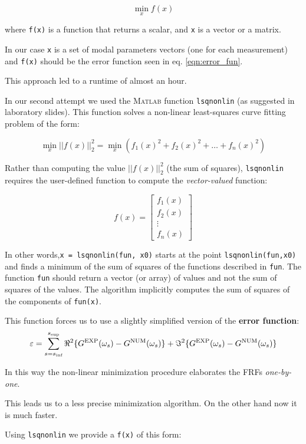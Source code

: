 \documentclass[a4paper,12pt,oneside]{article}
\begin{document}
\[
	\min_x f(x)
\]

where \lstinline!f(x)! is a function that returns a scalar, and \lstinline!x! is a vector or a matrix. 

In our case \lstinline!x! is a set of modal parameters vectors (one for each measurement) and \lstinline!f(x)! should be the error function seen in eq. \ref{eqn:error_fun}.

This approach led to a runtime of almost an hour.

In our second attempt we used the \textsc{Matlab} function \lstinline!lsqnonlin! (as suggested in laboratory slides). This function solves a non-linear least-squares curve fitting problem of the form:

\[
	\min_x ||f(x)||_2^2 =
	\min_x \left(f_1 (x)^2 + f_2(x)^2 + \ldots + f_n (x)^2 \right) 
\]

Rather than computing the value $ ||f(x)||_2^2 $ (the sum of squares), \lstinline!lsqnonlin! requires the user-defined function to compute the \textit{vector-valued} function:

\[
	f(x) = 
		\begin{bmatrix} f_1 (x) \\ f_2 (x) \\ \vdots \\ f_n (x) \end{bmatrix}
\]

In other words,\lstinline!x = lsqnonlin(fun, x0)! starts at the point \lstinline!lsqnonlin(fun,x0)! and finds a minimum of the sum of squares of the functions described in \lstinline!fun!. The function \lstinline!fun! should return a vector (or array) of values and not the sum of squares of the values. The algorithm implicitly computes the sum of squares of the components of \lstinline!fun(x)!.

This function forces us to use a slightly simplified version of the \textbf{error function}:
\begin{equation}
\label{eqn:error_fun2} 
	\varepsilon = \sum_{s=s_\textup{inf}}^{s_\textup{sup}}
		\Re^2\{G^\textup{EXP}(\omega_s) - G^\textup{NUM}(\omega_s)\} +
		\Im^2\{G^\textup{EXP}(\omega_s) - G^\textup{NUM}(\omega_s)\}
\end{equation}

In this way the non-linear minimization procedure elaborates the FRFs \textsl{one-by-one}.

This leads us to a less precise minimization algorithm. On the other hand now it is much faster. 

Using \lstinline!lsqnonlin! we provide a \lstinline!f(x)! of this form:
\end{document}
